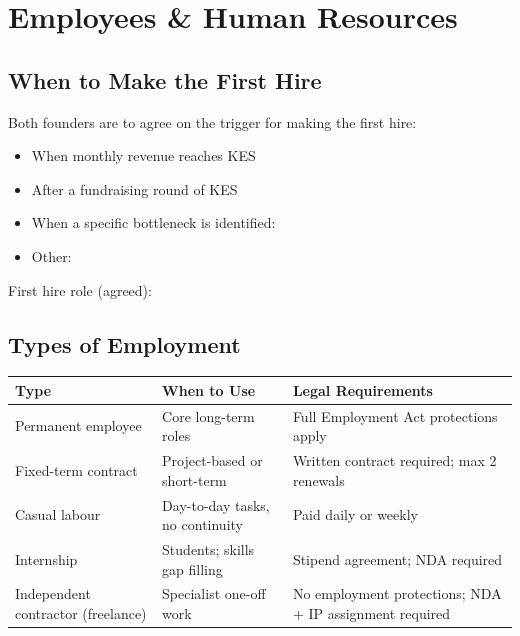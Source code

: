 \documentclass[12pt,a4paper]{article}
\newcommand{\blank}[1][5.5cm]{\underline{\hspace{#1}}}
\newcommand{\cb}{$\square$\;}                   %
\begin{document}
\section{Employees \& Human Resources}

\subsection{When to Make the First Hire}

Both founders are to agree on the trigger for making the first hire:

\begin{itemize}[label=\cb]
  \item When monthly revenue reaches KES \blank[3.5cm]
  \item After a fundraising round of KES \blank[3.5cm]
  \item When a specific bottleneck is identified: \blank[5cm]
  \item Other: \blank[5cm]
\end{itemize}

\noindent First hire role (agreed): \blank[7cm]

\subsection{Types of Employment}

\begin{tabularx}{\linewidth}{L{3.5cm} X L{3.5cm}}
  \toprule
  \textbf{Type} & \textbf{When to Use} & \textbf{Legal Requirements} \\
  \midrule
  Permanent employee  & Core long-term roles & Full Employment Act protections apply \\[0.3em]
  Fixed-term contract & Project-based or short-term & Written contract required; max 2 renewals \\[0.3em]
  Casual labour       & Day-to-day tasks, no continuity & Paid daily or weekly \\[0.3em]
  Internship          & Students; skills gap filling & Stipend agreement; NDA required \\[0.3em]
  Independent contractor (freelance) & Specialist one-off work & No employment protections; NDA + IP assignment required \\
  \bottomrule
\end{tabularx}
\end{document}
